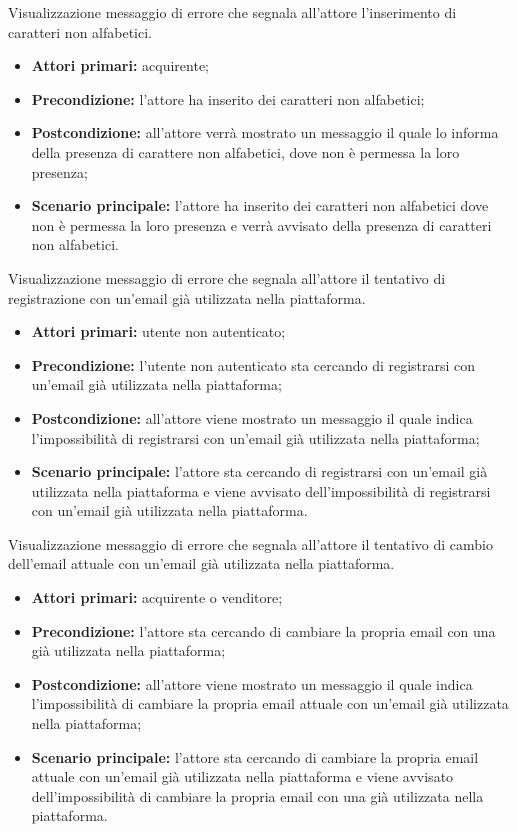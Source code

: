 Visualizzazione messaggio di errore che segnala all'attore l'inserimento di caratteri non alfabetici.
\begin{itemize}
    \item \textbf{Attori primari:} acquirente;
    \item \textbf{Precondizione:} l'attore ha inserito dei caratteri non alfabetici;
    \item \textbf{Postcondizione:} all'attore verrà mostrato un messaggio il quale lo informa della presenza di carattere non alfabetici, dove non è permessa la loro presenza;
    \item \textbf{Scenario principale:} l'attore ha inserito dei caratteri non alfabetici dove non è permessa la loro presenza e verrà avvisato della presenza di caratteri non alfabetici.
\end{itemize}

Visualizzazione messaggio di errore che segnala all'attore il tentativo di registrazione con un'email già utilizzata nella piattaforma.
\begin{itemize}
    \item \textbf{Attori primari:} utente non autenticato;
    \item \textbf{Precondizione:} l'utente non autenticato sta cercando di registrarsi con un'email già utilizzata nella piattaforma;
    \item \textbf{Postcondizione:} all'attore viene mostrato un messaggio il quale indica l'impossibilità di registrarsi con un'email già utilizzata nella piattaforma;
    \item \textbf{Scenario principale:} l'attore sta cercando di registrarsi con un'email già utilizzata nella piattaforma e viene avvisato dell'impossibilità di registrarsi con un'email già utilizzata nella piattaforma.
\end{itemize}

Visualizzazione messaggio di errore che segnala all'attore il tentativo di cambio dell'email attuale con un'email già utilizzata nella piattaforma.
\begin{itemize}
    \item \textbf{Attori primari:} acquirente o venditore;
    \item \textbf{Precondizione:} l'attore sta cercando di cambiare la propria email con una già utilizzata nella piattaforma;
    \item \textbf{Postcondizione:} all'attore viene mostrato un messaggio il quale indica l'impossibilità di cambiare la propria email attuale con un'email già utilizzata nella piattaforma;
    \item \textbf{Scenario principale:} l'attore sta cercando di cambiare la propria email attuale con un'email già utilizzata nella piattaforma e viene avvisato dell'impossibilità di cambiare la propria email con una già utilizzata nella piattaforma.
\end{itemize}


